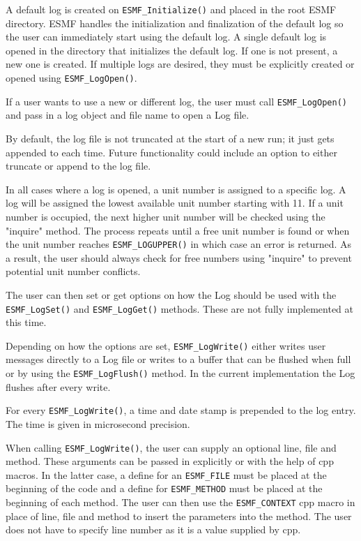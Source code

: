 

A default log is created on {\tt ESMF\_Initialize()} and placed in the
root ESMF directory.  ESMF handles the initialization and finalization of
the default log so the user can immediately start using the default log.
A single default log is opened in the directory that initializes the default
log.  If one is not present, a new one is created.  If multiple logs are 
desired, they must be explicitly created or opened using 
{\tt ESMF\_LogOpen()}.

If a user wants to use a new or different log, the user must call
{\tt ESMF\_LogOpen()} and pass in a log object and file name to open a Log 
file.
 
By default, the log file is not truncated at the start of a new run; it just
gets appended to each time.  Future functionality could include an option to
either truncate or append to the log file. 

In all cases where a log is opened, a unit number is assigned to a specific
log.  A log will be assigned the lowest available unit number starting with
11.  If a unit number is occupied, the next higher unit number will be 
checked using the "inquire" method.  The process repeats until a free unit 
number is found or when the unit number reaches {\tt ESMF\_LOGUPPER()} in 
which case an error is returned.  As a result, the user should always check
for free numbers using "inquire" to prevent potential unit number conflicts.

The user can then set or get options on how the Log should be used 
with the {\tt ESMF\_LogSet()} and {\tt ESMF\_LogGet()} methods.  These are 
not fully implemented at this time. 

Depending on how the options are set, {\tt ESMF\_LogWrite()} either writes user
messages directly to a Log file or writes to a buffer that can be flushed when 
full or by using the {\tt ESMF\_LogFlush()} method.  In the current 
implementation the Log flushes after every write.  

For every {\tt ESMF\_LogWrite()}, a time and date stamp is prepended to the
log entry.  The time is given in microsecond precision.

When calling {\tt ESMF\_LogWrite()}, the user can supply an optional line,
file and method.  These arguments can be passed in explicitly or with the help
of cpp macros.  In the latter case, a define for an {\tt ESMF\_FILE} must be 
placed at the beginning of the code and a define for {\tt ESMF\_METHOD} must
be placed at the beginning of each method.  The user can then use the
{\tt ESMF\_CONTEXT} cpp macro in place of line, file and method to insert the 
parameters into the method.  The user does not have to specify line number as
it is a value supplied by cpp.

